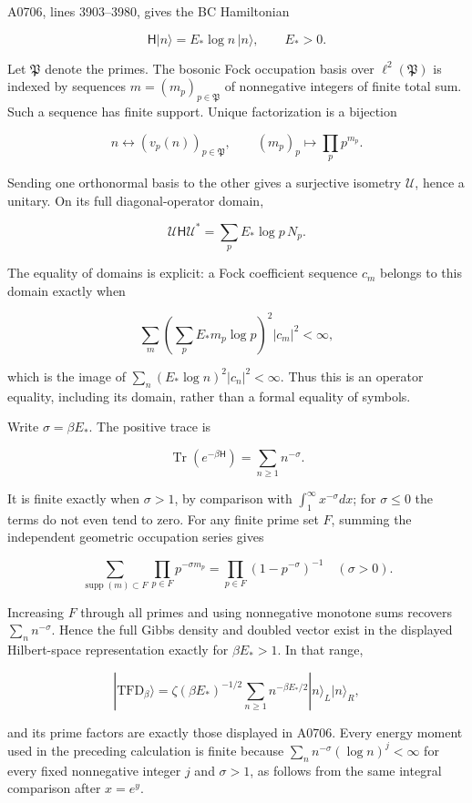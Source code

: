 \documentclass[10pt,a4paper,oneside]{report}
\begin{document}
A0706, lines 3903--3980, gives the BC Hamiltonian

\[
\mathsf H|n\rangle=E_*\log n\,|n\rangle,
\qquad E_*>0.
\]

Let \(\mathfrak P\) denote the primes. The bosonic Fock occupation basis
over \(\ell^2(\mathfrak P)\) is indexed by sequences
\(m=(m_p)_{p\in\mathfrak P}\) of nonnegative integers of finite total
sum. Such a sequence has finite support. Unique factorization is a
bijection

\[
n\longleftrightarrow(v_p(n))_{p\in\mathfrak P},
\qquad (m_p)_p\longmapsto\prod_pp^{m_p}.
\]

Sending one orthonormal basis to the other gives a surjective isometry
\(\mathcal U\), hence a unitary. On its full diagonal-operator domain,

\[
\mathcal U\mathsf H\mathcal U^*=\sum_pE_*\log p\,N_p.
\]

The equality of domains is explicit: a Fock coefficient sequence \(c_m\)
belongs to this domain exactly when

\[
\sum_m\left(\sum_pE_*m_p\log p\right)^2|c_m|^2<\infty,
\]

which is the image of \(\sum_n(E_*\log n)^2|c_n|^2<\infty\). Thus this
is an operator equality, including its domain, rather than a formal
equality of symbols.

Write \(\sigma=\beta E_*\). The positive trace is

\[
\operatorname{Tr}(e^{-\beta\mathsf H})=\sum_{n\ge1}n^{-\sigma}.
\]

It is finite exactly when \(\sigma>1\), by comparison with
\(\int_1^\infty x^{-\sigma}dx\); for \(\sigma\le0\) the terms do not
even tend to zero. For any finite prime set \(F\), summing the
independent geometric occupation series gives

\[
\sum_{\operatorname{supp}(m)\subset F}\prod_{p\in F}p^{-\sigma m_p}
=\prod_{p\in F}(1-p^{-\sigma})^{-1}\quad(\sigma>0).
\]

Increasing \(F\) through all primes and using nonnegative monotone sums
recovers \(\sum_n n^{-\sigma}\). Hence the full Gibbs density and
doubled vector exist in the displayed Hilbert-space representation
exactly for \(\beta E_*>1\). In that range,

\[
|\mathrm{TFD}_\beta\rangle
=\zeta(\beta E_*)^{-1/2}\sum_{n\ge1}n^{-\beta E_*/2}|n\rangle_L|n\rangle_R,
\]

and its prime factors are exactly those displayed in A0706. Every energy
moment used in the preceding calculation is finite because
\(\sum_n n^{-\sigma}(\log n)^j<\infty\) for every fixed nonnegative
integer \(j\) and \(\sigma>1\), as follows from the same integral
comparison after \(x=e^y\).
\end{document}
